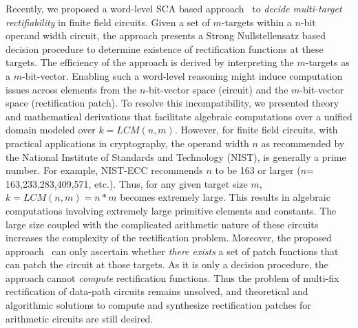 {Recently, we proposed a word-level SCA based approach~\cite{Vkrao:ISQED21} 
to {\it decide multi-target rectifiability} in finite field circuits. 
Given a set of $m$-targets within a $n$-bit operand width circuit, 
the approach presents a Strong Nullstellensatz based decision procedure
to determine existence of rectification functions at these targets.
The efficiency of the approach is derived by interpreting the $m$-targets
as a $m$-bit-vector. Enabling such a word-level reasoning might induce 
computation issues across elements from the $n$-bit-vector space (circuit) 
and the $m$-bit-vector space (rectification patch). To resolve this
incompatibility, we presented theory and mathematical derivations that
facilitate algebraic computations over a unified domain modeled over 
$k=LCM(n,m)$. However, for finite field circuits, with practical applications 
in cryptography, the operand width $n$ as recommended by the National 
Institute of Standards and Technology (NIST), is generally a prime number. 
For example, NIST-ECC recommends $n$ to be 163 or larger 
($n$= 163,233,283,409,571, etc.). Thus, for any given target size $m$, 
$k=LCM(n,m)=n*m$ becomes extremely large. This results in algebraic 
computations involving extremely large primitive elements and constants.
The large size coupled with the complicated arithmetic nature of these 
circuits increases the complexity of the rectification problem.
Moreover, the proposed approach~\cite{Vkrao:ISQED21} can only ascertain 
whether {\it there exists} a set of patch functions that can patch the 
circuit at those targets. As it is only a decision procedure, the 
approach cannot {\it compute} rectification functions. Thus the problem 
of multi-fix rectification of data-path circuits remains unsolved, and 
theoretical and algorithmic solutions to compute and synthesize 
rectification patches for arithmetic circuits are still desired.}

